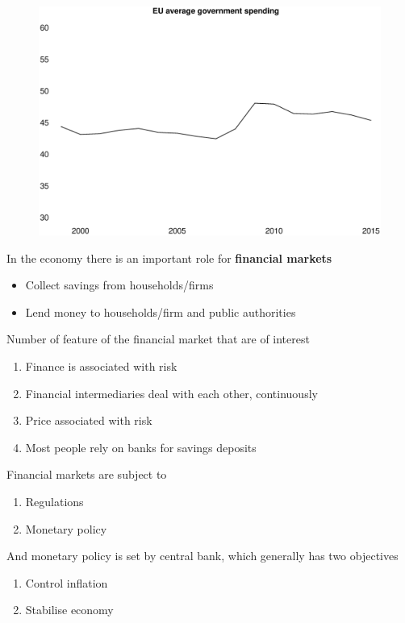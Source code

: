 \documentclass{beamer}
\begin{document}
\begin{frame}
  \begin{figure}
    \includegraphics[scale=.2]{eu_G.eps}
  \end{figure}
\end{frame}

\begin{frame}
  In the economy there is an important role for \textbf{financial markets}
  \begin{itemize}
     \item Collect savings from households/firms
     \item Lend money to households/firm and public authorities
   \end{itemize} 
   \medskip
   Number of feature of the financial market that are of interest
  \begin{enumerate}
    \item Finance is associated with risk
    \item Financial intermediaries deal with each other, continuously
    \item Price associated with risk
    \item Most people rely on banks for savings deposits
  \end{enumerate}
\end{frame}

\begin{frame}
  Financial markets are subject to 
  \begin{enumerate}
    \item Regulations
    \item Monetary policy
  \end{enumerate}
  And monetary policy is set by central bank, which generally has two objectives
  \medskip
  \begin{enumerate}
    \item Control inflation
    \item Stabilise economy
  \end{enumerate}  
\end{frame}
\end{document}
